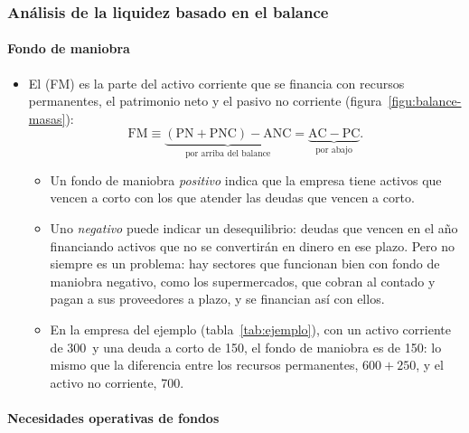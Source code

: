 \documentclass[11pt]{article}
\begin{document}
\subsubsection{Análisis de la liquidez basado en el balance}\label{sec:liquidez-balance}

\paragraph{Fondo de maniobra}

\begin{itemize}
\item El  (FM) es la parte del activo corriente que se financia con recursos permanentes, el patrimonio neto y el pasivo no corriente (figura~\ref{figu:balance-masas}):
  \begin{equation}\label{eq:fm}
  \mathrm{FM}\equiv\underbrace{(\mathrm{PN}+\mathrm{PNC})-\mathrm{ANC}}_{\text{por arriba del balance}}=\underbrace{\mathrm{AC}-\mathrm{PC}}_{\text{por abajo}}.
  \end{equation}
  \begin{itemize}
  \item Un fondo de maniobra \emph{positivo} indica que la empresa tiene activos que vencen a corto con los que atender las deudas que vencen a corto.
  \item Uno \emph{negativo} puede indicar un desequilibrio: deudas que vencen en el año financiando activos que no se convertirán en dinero en ese plazo. Pero no siempre es un problema: hay sectores que funcionan bien con fondo de maniobra negativo, como los supermercados, que cobran al contado y pagan a sus proveedores a plazo, y se financian así con ellos.
  \item En la empresa del ejemplo (tabla~\ref{tab:ejemplo}), con un activo corriente de 300~y una deuda a corto de 150, el fondo de maniobra es de 150: lo mismo que la diferencia entre los recursos permanentes, $600+250$, y el activo no corriente, 700.
  \end{itemize}
\end{itemize}

\begin{infografia}[H]
\centering
\caption{El fondo de maniobra sobre el balance por masas}\label{figu:balance-masas}
\end{infografia}

\paragraph{Necesidades operativas de fondos}
\end{document}
